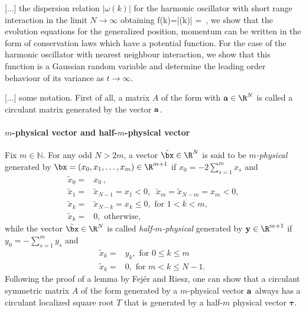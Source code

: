 {[...]
the dispersion relation  $|\omega(k)|$  for the harmonic oscillator with
short range interaction in the limit $N\to\infty$ obtaining
\beq
	\label{GKMM21:dispersion0}
	f(k)=|\omega(k)|
=
\,,
\eeq
[...]
we show that the evolution equations for the generalized position,
momentum can be written in the form of  conservation laws which have a
potential function.
 For the case of the harmonic oscillator with nearest neighbour interaction, we show that this function is  a Gaussian random variable
and determine the leading order behaviour of its variance as $t\to\infty$.

[...] some notation.   First of all,  a matrix $A$ of the form
 with ${\bf{a}}\in\R^N$ is called a circulant matrix generated by the vector ${\bf{a}}$.
	\paragraph{$m$-physical vector and half-$m$-physical vector}
	\label{GKMM21:def:ph}
			Fix $m \in {\mathbb N}$.
			For any odd $ N > 2m$, a   vector $\tilde{\bx}\in \R^{N}$  is said to be  {\em $m$-physical} generated by $\bx=(x_0,x_1,\dots, x_m)\in \R^{m +1}$ if $x_0=-2\sum_{s=1}^mx_s$ and 				
			\begin{align}
            \label{GKMM21:HalfVector}
				\tilde{x}_0 = & x_0 \, ,\\
				\tilde{x}_1= &\tilde{x}_{N-1} = x_1<0 ,\;\;\tilde{x}_m= \tilde{x}_{N-m} = x_m<0,\\
			\tilde{x}_k= &\tilde{x}_{N-k} = x_k \leq 0, \mbox{ for  $1< k <  m$},\\
			 \tilde{x}_{k} =& 0, \mbox{  otherwise,}
						\end{align}
	while the  vector  $\tilde{\bx}\in \R^{N}$  is called  {\em half-$m$-physical} generated by ${\bf{y}}\in  \R^{m +1}$ if  $y_0=-\sum_{s=1}^my_s$  and	\begin{align*}
		\tilde{x}_k=  & y_k,  \mbox{ for  $0 \leq k \leq m$   } \\
		\tilde{x}_k=&0,  \mbox{ for  $m< k \leq N-1$.   }
		\end{align*}
Following  the proof of a lemma by Fej\'er and Riesz, one can show that a
circulant symmetric matrix $A$ of the form   generated
by  a $m$-physical vector ${\bf{a}}$ always has a circulant localized
square root
$T$  that is generated by a half-$m$ physical vector ${\boldsymbol{\tau}}$.

}
